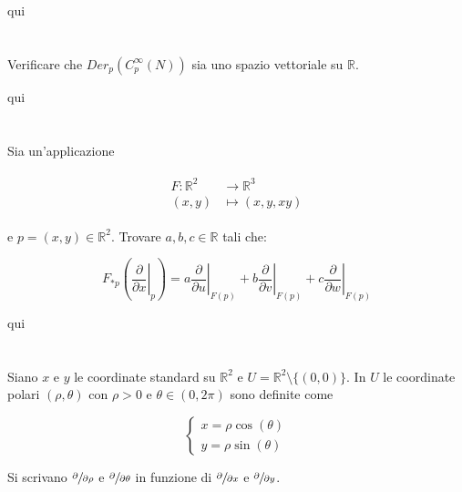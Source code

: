 qui

\section{}\label{BONUS2-2}

\begin{tcolorbox}
	Verificare che $ Der_{p}(C_{p}^{\infty}(N)) $ sia uno spazio vettoriale su $ \mathbb{R} $.
\end{tcolorbox}

qui

\section{}\label{es2-8}

\begin{tcolorbox}
	Sia un'applicazione
	
	\begin{align}
		\begin{split}
			F : \mathbb{R}^{2} &\to \mathbb{R}^{3}\\
			(x,y) &\mapsto (x,y,xy)
		\end{split}
	\end{align}
	
	e $ p = (x,y) \in \mathbb{R}^{2} $. Trovare $ a,b,c \in \mathbb{R} $ tali che:
	
	\begin{equation}
		F_{*p} \left( \left. \dfrac{\partial}{\partial x} \right|_{p} \right) = a \left. \dfrac{\partial}{\partial u} \right|_{F(p)} + b \left. \dfrac{\partial}{\partial v} \right|_{F(p)} + c \left. \dfrac{\partial}{\partial w} \right|_{F(p)}
	\end{equation}
\end{tcolorbox}

qui

\section{}\label{es2-9}

\begin{tcolorbox}
	Siano $ x $ e $ y $ le coordinate standard su $ \mathbb{R}^{2} $ e $ U = \mathbb{R}^{2} \setminus \{(0,0)\} $. In $ U $ le coordinate polari $ (\rho, \theta) $ con $ \rho > 0 $ e $ \theta \in (0,2\pi) $ sono definite come
	
	\begin{equation}
		\begin{cases}
			x = \rho \cos(\theta)\\
			y = \rho \sin(\theta)
		\end{cases}
	\end{equation}
	
	Si scrivano $ \sfrac{\partial}{\partial \rho} $ e $ \sfrac{\partial}{\partial \theta} $ in funzione di $ \sfrac{\partial}{\partial x} $ e $ \sfrac{\partial}{\partial y} $.
\end{tcolorbox}

